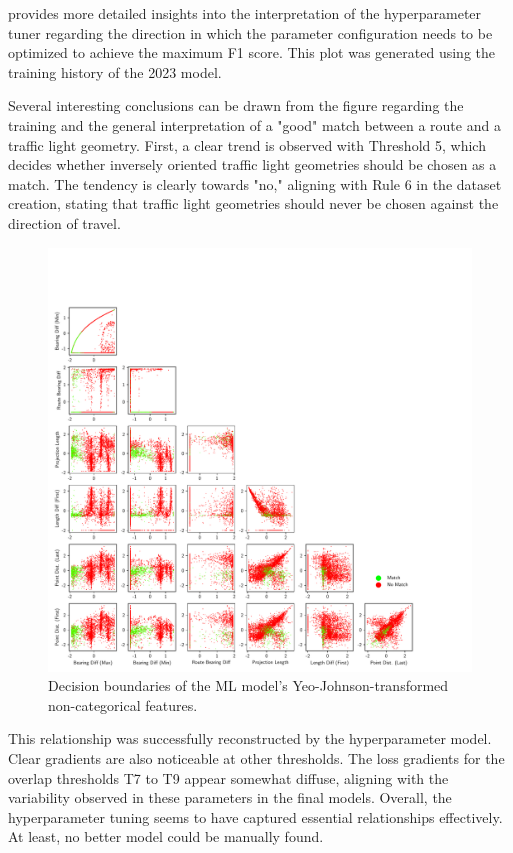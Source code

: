  provides more detailed insights into the interpretation of the hyperparameter tuner regarding the direction in which the parameter configuration needs to be optimized to achieve the maximum F1 score. This plot was generated using the training history of the 2023 model.

Several interesting conclusions can be drawn from the figure regarding the training and the general interpretation of a "good" match between a route and a traffic light geometry. First, a clear trend is observed with Threshold 5, which decides whether inversely oriented traffic light geometries should be chosen as a match. The tendency is clearly towards "no," aligning with Rule 6 in the dataset creation, stating that traffic light geometries should never be chosen against the direction of travel. 

\begin{figure}[H]
\centering 
\includegraphics[width=\linewidth,bb=0 0 760 760]{images/decision-boundaries.pdf}
\caption{Decision boundaries of the ML model's Yeo-Johnson-transformed non-categorical features.}
\label{fig:ml-model-decision-boundaries}
\end{figure}

This relationship was successfully reconstructed by the hyperparameter model. Clear gradients are also noticeable at other thresholds. The loss gradients for the overlap thresholds T7 to T9 appear somewhat diffuse, aligning with the variability observed in these parameters in the final models. Overall, the hyperparameter tuning seems to have captured essential relationships effectively. At least, no better model could be manually found.

